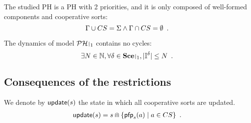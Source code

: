 \begin{criterion}
\label{cr:compcs}
  The studied PH is a PH with 2 priorities, and it is only composed of well-formed components and cooperative sorts:
  $$\Gamma \cup CS = \Sigma \wedge \Gamma \cap CS = \emptyset \enspace.$$
\end{criterion}

\begin{criterion}
\label{cr:bounded}
  The dynamics of model $\restriction{\PH}{1}$ contains no cycles:
  $$\exists N \in \sN, \forall \delta \in \restriction{\Sce}{1}, |\indexes{\delta}| \leq N \enspace.$$
\end{criterion}



\subsection{Consequences of the restrictions}
We denote by $\mathsf{update}(s)$ the state in which all cooperative sorts are updated.
\begin{align*}
  \mathsf{update}(s) = s \Cap \{ \mathsf{pfp}_{s}(a) \mid a \in CS \} \enspace.
\end{align*}

